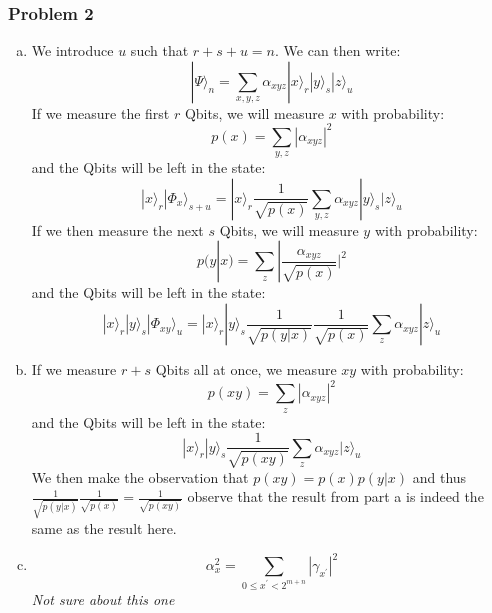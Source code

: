 \documentclass[a4paper,11pt]{article}
\begin{document}
\subsubsection*{Problem 2}
\begin{enumerate}[a)]
    \item We introduce $u$ such that $r+s+u=n$. We can then write:
        $$|\Psi\rangle_n=\sum\limits_{x,y,z}\alpha_{xyz}|x\rangle_r|y\rangle_s|z\rangle_u$$
        If we measure the first $r$ Qbits, we will measure $x$ with probability:
        $$p(x)=\sum\limits_{y,z}|\alpha_{xyz}|^2$$ 
        and the Qbits will be left in the state:
        $$|x\rangle_r|\Phi_x\rangle_{s+u}=|x\rangle_r\frac{1}{\sqrt{p(x)}}\sum\limits_{y,z}\alpha_{xyz}|y\rangle_s|z\rangle_u$$
        If we then measure the next $s$ Qbits, we will measure $y$ with probability:
        $$p(y|x)=\sum\limits_{z}|\frac{\alpha_{xyz}}{\sqrt{p(x)}}|^2$$ 
        and the Qbits will be left in the state:
        $$|x\rangle_r|y\rangle_s|\Phi_{xy}\rangle_{u}=|x\rangle_r|y\rangle_s\frac{1}{\sqrt{p(y|x)}}\frac{1}{\sqrt{p(x)}}\sum\limits_{z}\alpha_{xyz}|z\rangle_u$$
    \item If we measure $r+s$ Qbits all at once, we measure $xy$ with probability:
        $$p(xy)=\sum\limits_{z}|\alpha_{xyz}|^2$$
        and the Qbits will be left in the state:
        $$|x\rangle_r|y\rangle_s\frac{1}{\sqrt{p(xy)}}\sum\limits_{z}\alpha_{xyz}|z\rangle_u$$
        We then make the observation that $p(xy)=p(x)p(y|x)$ and thus $\frac{1}{\sqrt{p(y|x)}}\frac{1}{\sqrt{p(x)}}=\frac{1}{\sqrt{p(xy)}}$ observe that the result from part a is indeed the same as the result here.
    \item $$\alpha_x^2=\sum\limits_{0\leq x^\prime<2^{m+n}}|\gamma_{x^\prime}|^2$$
\emph{\color{red} Not sure about this one}
\end{enumerate}
\end{document}
